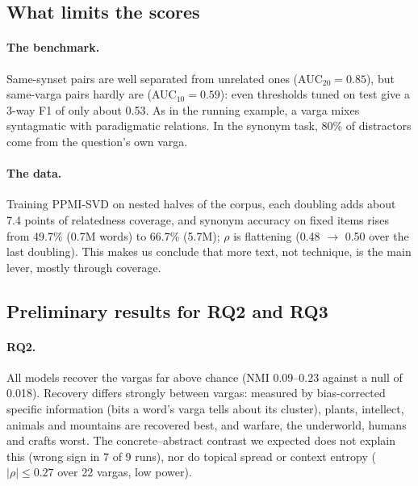 \documentclass[11pt]{article}
\newcommand{\vk}[1]{\textsf{#1}}
\begin{document}
\begin{table}[t]\centering\footnotesize
\setlength{\tabcolsep}{3.5pt}

\caption{EvalSan's protocol and original files. S\&al.: published numbers
\citep[Table~3]{sandhan2023evalsan}. Ours: leak-free corpus, \vk{lem}
(syntactic categorisation: \vk{seg}). Their protocol skips synonym items with
an OOV word; ``items'' is the number scored.}
\label{tab:compare}
\end{table}

\subsection{What limits the scores}\label{sec:limits}
\paragraph{The benchmark.} Same-synset pairs are well separated from
unrelated ones (AUC$_{20}=0.85$), but same-varga pairs hardly are
(AUC$_{10}=0.59$): even thresholds tuned on test give a 3-way F1 of only
about 0.53. As in the running example, a varga mixes syntagmatic with
paradigmatic relations. In the synonym task, 80\% of distractors come from
the question's own varga.
\paragraph{The data.} Training PPMI-SVD on nested halves of the corpus, each
doubling adds about 7.4 points of relatedness coverage, and synonym accuracy
on fixed items rises from 49.7\% (0.7M words) to 66.7\% (5.7M); $\rho$ is
flattening (0.48 $\to$ 0.50 over the last doubling). This makes us conclude
that more text, not technique, is the main lever, mostly through coverage.

\subsection{Preliminary results for RQ2 and RQ3}\label{sec:prelim}
\paragraph{RQ2.} All models recover the vargas far above chance (NMI
0.09--0.23 against a null of 0.018). Recovery differs strongly between
vargas: measured by bias-corrected specific information (bits a word's varga
tells about its cluster), plants, intellect, animals and mountains are
recovered best, and warfare, the underworld, humans and crafts worst. The
concrete--abstract contrast we expected does not explain this (wrong sign in
7 of 9 runs), nor do topical spread or context entropy ($|\rho|\le0.27$
over 22 vargas, low power).
\end{document}
